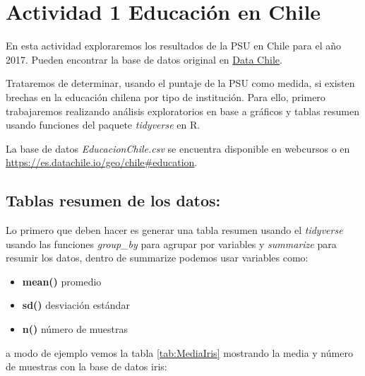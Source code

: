 \documentclass[]{book}
\newenvironment{Shaded}{\begin{snugshade}}{\end{snugshade}}
\newcommand{\DataTypeTok}[1]{\textcolor[rgb]{0.13,0.29,0.53}{#1}}
\newcommand{\KeywordTok}[1]{\textcolor[rgb]{0.13,0.29,0.53}{\textbf{#1}}}
\newcommand{\NormalTok}[1]{#1}
\newcommand{\OperatorTok}[1]{\textcolor[rgb]{0.81,0.36,0.00}{\textbf{#1}}}
\newcommand{\StringTok}[1]{\textcolor[rgb]{0.31,0.60,0.02}{#1}}
\providecommand{\tightlist}{%
  \setlength{\itemsep}{0pt}\setlength{\parskip}{0pt}}
\begin{document}
\hypertarget{actividad-1-educacion-en-chile}{%
\section{Actividad 1 Educación en Chile}\label{actividad-1-educacion-en-chile}}

En esta actividad exploraremos los resultados de la PSU en Chile para el año 2017. Pueden encontrar la base de datos original en \href{https://es.datachile.io/geo/chile\#education}{Data Chile}.

Trataremos de determinar, usando el puntaje de la PSU como medida, si existen brechas en la educación chilena por tipo de institución. Para ello, primero trabajaremos realizando análisis exploratorios en base a gráficos y tablas resumen usando funciones del paquete \emph{tidyverse} \citep{WickhamTidy2017} en R.

La base de datos \emph{EducacionChile.csv} se encuentra disponible en webcursos o en \url{https://es.datachile.io/geo/chile\#education}.

\hypertarget{tablas-resumen-de-los-datos}{%
\subsection{Tablas resumen de los datos:}\label{tablas-resumen-de-los-datos}}

Lo primero que deben hacer es generar una tabla resumen usando el \emph{tidyverse} usando las funciones \emph{group\_by} para agrupar por variables y \emph{summarize} para resumir los datos, dentro de summarize podemos usar variables como:

\begin{itemize}
\tightlist
\item
  \textbf{mean()} promedio
\item
  \textbf{sd()} desviación estándar
\item
  \textbf{n()} número de muestras
\end{itemize}

a modo de ejemplo vemos la tabla \ref{tab:MediaIris} mostrando la media y número de muestras con la base de datos iris:

\begin{Shaded}
\end{Shaded}
\end{document}
